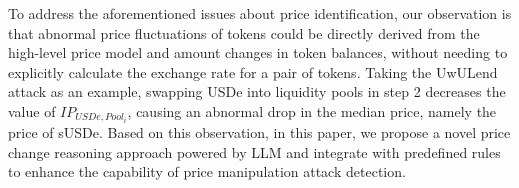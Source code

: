 To address the aforementioned issues about price identification, 
our observation is that abnormal price fluctuations of tokens could be directly derived from the high-level price model and amount changes in token balances, without needing to explicitly calculate the exchange rate for a pair of tokens. 
Taking the UwULend attack as an example, swapping USDe into liquidity pools in step 2 decreases the value of $IP_{USDe,Pool_i}$, causing an abnormal drop in the median price, namely the price of sUSDe. 
Based on this observation, in this paper, we propose a novel price change reasoning approach powered by LLM and integrate with predefined rules to enhance the capability of price manipulation attack detection.  



